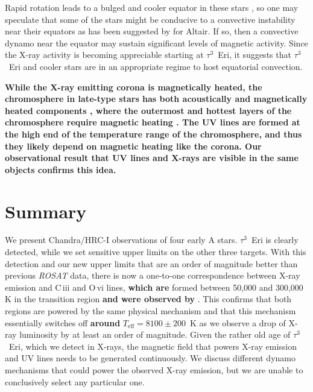 \documentclass[linenumbers]{aastex631}
\begin{document}
Rapid rotation leads to a bulged and cooler equator in these stars \citep[on Altair][resolved a temperature difference between pole and equator of at least 1000~K]{2007Sci...317..342M}, so one may speculate that some of the stars might be conducive to a convective instability near their equators as has been suggested by \citet{2009A&A...497..511R} for Altair. If so, then a convective dynamo near the equator may sustain significant levels of magnetic activity. Since the X-ray activity is becoming appreciable starting at $\tau^3$~Eri, it suggests that $\tau^3$~Eri and cooler stars are in an appropriate regime to host equatorial convection. 

\textbf{While the X-ray emitting corona is magnetically heated, the chromosphere in late-type stars has both acoustically and magnetically heated components \citep{1999ApJ...522.1053C,2000ssma.book.....S}, where the outermost and hottest layers of the chromosphere require magnetic heating \citep{2002A&A...386..983F}. The UV lines are formed at the high end of the temperature range of the chromosphere, and thus they likely depend on magnetic heating like the corona. Our observational result that UV lines and X-rays are visible in the same objects confirms this idea.}


\section{Summary}
\label{sec:summary}
We present Chandra/HRC-I observations of four early A stars. $\tau^3$~Eri is clearly detected, while we set sensitive upper limits on the other three targets. With this detection and our new upper limits that are an order of magnitude better than previous \emph{ROSAT} data, there is now a one-to-one correspondence between X-ray emission and C\,{\sc iii} and O\,{\sc vi} lines, \textbf{which are} formed between 50,000 and 300,000 K in the transition region \textbf{and were observed by} \citet{2002ApJ...579..800S}. This confirms that both regions are powered by the same physical mechanism and that this mechanism essentially switches off \textbf{around} $T_\mathrm{eff}=8100\pm200$~K as we observe a drop of X-ray luminosity by at least an order of magnitude. Given the rather old age of $\tau^3$~Eri, which we detect in X-rays, the magnetic field that powers X-ray emission and UV lines needs to be generated continuously. We discuss different dynamo mechanisms that could power the observed X-ray emission, but we are unable to conclusively select any particular one.
\end{document}
